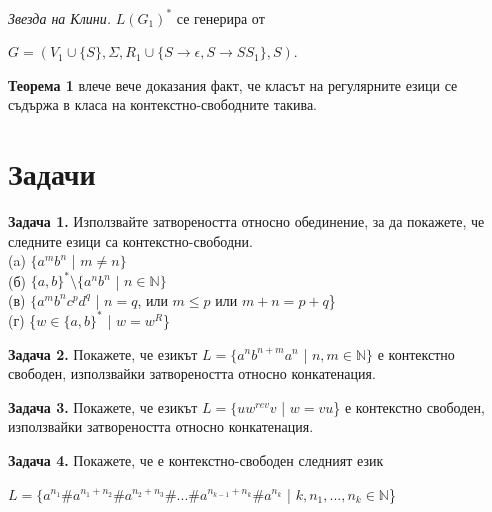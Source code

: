 \documentclass{article}
\begin{document}
    \vspace{5pt}
    
    \hspace{15pt}\textit{Звезда на Клини.} $L(G_1)^*$ се генерира от \\
    \begin{center}
         $G = (V_1 \cup \{S\},\Sigma,R_1 \cup \{S \rightarrow \epsilon, S \rightarrow SS_1\},S)$.
    \end{center}

    \vspace{15pt}

    \hspace{15pt} \textbf{Теорема 1} влече вече доказания факт, че класът на регулярните
    езици се съдържа в класа на контекстно-свободните такива.
\vspace{25pt}

\section{Задачи}
    \textbf{Задача 1.} Използвайте затвореността относно обединение, за да покажете, че 
    следните езици са контекстно-свободни. \\
    (a) $\{a^mb^n$ | $m \neq n\}$ \\
    (б) $\{a,b\}^* \setminus \{a^nb^n$ | $n \in \mathbb{N}\}$ \\
    (в) $\{a^mb^nc^pd^q$ | $n = q$, или $m \leq p$ или $m+n = p+q$\} \\
    (г) \{$w \in \{a,b\}^*$ | $w = w^R$\}

    \vspace{15pt}

    \textbf{Задача 2.} Покажете, че езикът $L = \{a^nb^{n+m}a^n$ | $n,m \in \mathbb{N}\}$ е контекстно свободен,
    използвайки затвореността относно конкатенация.

    \vspace{15pt}

    \textbf{Задача 3.} Покажете, че езикът $L = \{uw^{rev}v$ | $w = vu$\} е контекстно
    свободен, използвайки затвореността относно конкатенация.

    \vspace{15pt}

    \textbf{Задача 4.} Покажете, че е контекстно-свободен следният език \\
    \begin{center}
        $L = \{a^{n_1}\#a^{n_1+n_2}\#a^{n_2+n_3}\#...\#a^{n_{k-1} + n_k}\#a^{n_k}$ | $k,n_1,...,n_k \in \mathbb{N}$\}
    \end{center}
\end{document}
